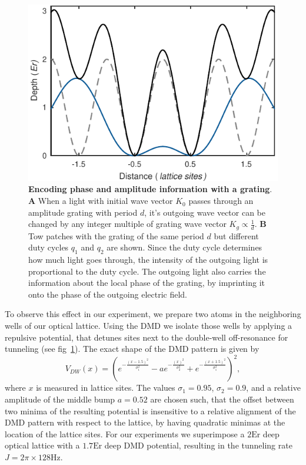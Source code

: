 \begin{figure}[t]
	\centering
	\includegraphics[scale=1]{figures/CBH_DW.pdf}
	\caption{{\bf Encoding phase and amplitude information with a grating}. {\bf A} When a light with initial wave vector $K_0$ passes through an amplitude grating with period $d$, it's outgoing wave vector can be changed by any integer multiple of grating wave vector $K_g\propto \frac{1}{d}$. {\bf B} Tow patches with the grating of the same period $d$ but different duty cycles $q_1$ and $q_2$ are shown. Since the duty cycle determines how much light goes through, the intensity of the outgoing light is proportional to the duty cycle. The outgoing light also carries the information about the local phase of the grating, by imprinting it onto the phase of the outgoing electric field.}
	\label{fig:CBH_DW}
\end{figure}

To observe this effect in our experiment, we prepare two atoms in the neighboring wells of our optical lattice. Using the DMD we isolate those wells by applying a repulsive potential, that detunes sites next to the double-well off-resonance for tunneling (see fig~\ref{fig:CBH_DW}). The exact shape of the DMD pattern is given by
\begin{equation}
V_{DW}(x) = (e^{-\frac{(x-1.5)^2}{\sigma_1^2}} - ae^{-\frac{(x)^2}{\sigma_2^2}} + e^{-\frac{(x+1.5)^2}{\sigma_1^2}})^2,
\end{equation}
where $x$ is measured in lattice sites. The values $\sigma_1 = 0.95$, $\sigma_2 = 0.9$, and a relative amplitude of the middle bump $a=0.52$ are chosen such, that the offset between two minima of the resulting potential is insensitive to a relative alignment of the DMD pattern with respect to the lattice, by having quadratic minimas at the location of the lattice sites. For our experiments we superimpose a $2\textrm{Er}$ deep optical lattice with a $1.7\textrm{Er}$ deep DMD potential, resulting in the tunneling rate $J = 2 \pi \times 128 \textrm{Hz}$.

